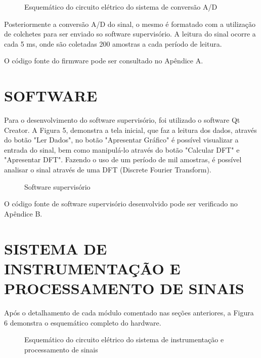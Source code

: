 \begin{figure}[htb]
	\caption{Esquemático do circuito elétrico do sistema de conversão A/D}
\end{figure}

Posteriormente a conversão A/D do sinal, o mesmo é formatado com a utilização de colchetes para ser enviado so software supervisório. A leitura do sinal ocorre a cada 5 ms, onde são coletadas 200 amostras a cada período de leitura.

O código fonte do firmware pode ser consultado no Apêndice A.

\section{SOFTWARE}
Para o desenvolvimento do software supervisório, foi utilizado o software Qt Creator. A Figura 5, demonstra a tela inicial, que faz a leitura dos dados, através do botão "Ler Dados", no botão "Apresentar Gráfico" é possível visualizar a entrada do sinal, bem como manipulá-lo através do botão "Calcular DFT" e "Apresentar DFT".  Fazendo o uso de um período de mil amostras, é possível analisar o sinal através de uma DFT (Discrete Fourier Transform). 

\begin{figure}[htb]
	\caption{Software supervisório}
\end{figure}

O código fonte de software supervisório desenvolvido pode ser verificado no Apêndice B.

\section{SISTEMA DE INSTRUMENTAÇÃO E PROCESSAMENTO DE SINAIS}
Após o detalhamento de cada módulo comentado nas seções anteriores, a Figura 6 demonstra o esquemático completo do hardware.

\begin{figure}[htb]
	\caption{Esquemático do circuito elétrico do sistema de instrumentação e processamento de sinais}
\end{figure}
